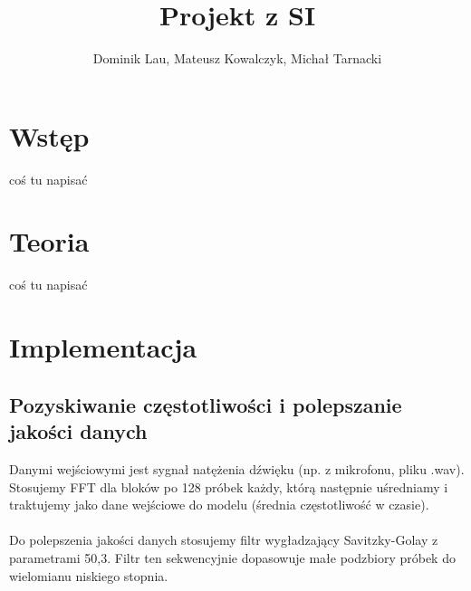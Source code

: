 \documentclass{article}
\title{Projekt z SI}
\author{Dominik Lau, Mateusz Kowalczyk, Michał Tarnacki}
\begin{document}
\maketitle

\section{Wstęp}
coś tu napisać
\section{Teoria}
coś tu napisać

\section{Implementacja}
\subsection{Pozyskiwanie częstotliwości i polepszanie jakości danych}
Danymi wejściowymi jest sygnał natężenia dźwięku (np. z mikrofonu, pliku .wav).
Stosujemy FFT dla bloków po 128 próbek każdy, którą następnie uśredniamy i traktujemy jako 
dane wejściowe do modelu (średnia częstotliwość w czasie).\\\\
Do polepszenia jakości danych stosujemy filtr wygładzający Savitzky-Golay z parametrami 50,3.
Filtr ten sekwencyjnie dopasowuje małe podzbiory próbek do wielomianu niskiego stopnia.
\end{document}
